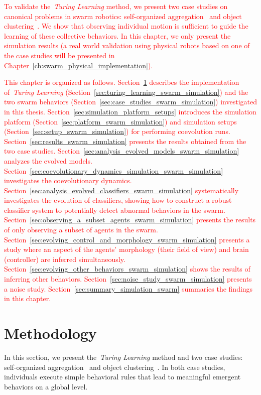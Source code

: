 \textcolor{red}{To validate the~\textit{Turing Learning} method, we present two case studies on canonical problems in swarm robotics: self-organized aggregation~\cite{Gauci2014_ijrr} and object clustering~\cite{Melvin2014_aamas}. We show that observing individual motion is sufficient to guide the learning of these collective behaviors. In this chapter, we only present the simulation results (a real world validation using physical robots based on one of the case studies will be presented in Chapter~\ref{ch:swarm_physical_implementation}).} 

\textcolor{red}{This chapter is organized as follows. Section~\ref{sec:methodology_swarm_simulation} describes the implementation of~\textit{Turing Learning} (Section~\ref{sec:turing_learning_swarm_simulation}) and the two swarm behaviors (Section~\ref{sec:case_studies_swarm_simulation}) investigated in this thesis. Section~\ref{sec:simulation_platform_setups} introduces the simulation platform (Section~\ref{sec:platform_swarm_simulation}) and simulation setups (Section~\ref{sec:setup_swarm_simulation}) for performing coevolution runs. Section~\ref{sec:results_swarm_simulation} presents the results obtained from the two case studies. Section~\ref{sec:analysis_evolved_models_swarm_simulation} analyzes the evolved models. Section~\ref{sec:coevolutionary_dynamics_simulation_swarm_simulation} investigates the coevolutionary dynamics. Section~\ref{sec:analysis_evolved_classifiers_swarm_simulation} systematically investigates the evolution of classifiers, showing how to construct a robust classifier system to potentially detect abnormal behaviors in the swarm. Section~\ref{sec:observing_a_subset_agents_swarm_simulation} presents the results of only observing a subset of agents in the swarm. Section~\ref{sec:evolving_control_and_morphology_swarm_simulation} presents a study where an aspect of the agents' morphology (their field of view) and brain (controller) are inferred simultaneously. Section~\ref{sec:evolving_other_behaviors_swarm_simulation} shows the results of inferring other behaviors. Section~\ref{sec:noise_study_swarm_simulation} presents a noise study. Section~\ref{sec:summary_simulation_swarm} summaries the findings in this chapter.}

\section{Methodology}\label{sec:methodology_swarm_simulation}

In this section, we present the~\textit{Turing Learning} method and two case studies: self-organized aggregation~\cite{Gauci2014_ijrr} and object clustering~\cite{Melvin2014_aamas}. In both case studies, individuals execute simple behavioral rules that lead to meaningful emergent behaviors on a global level. 

